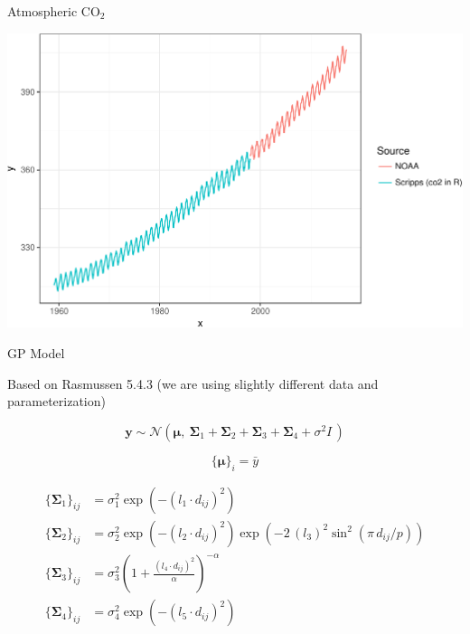 \documentclass[11pt,ignorenonframetext,]{beamer}
\begin{document}
\begin{frame}{%
\protect\hypertarget{atmospheric-co_2}{%
Atmospheric CO\(_2\)}}

\begin{center}\includegraphics[width=\textwidth]{Lec14_files/figure-beamer/unnamed-chunk-14-1} \end{center}

\end{frame}

\begin{frame}[t]{%
\protect\hypertarget{gp-model}{%
GP Model}}

Based on Rasmussen 5.4.3 (we are using slightly different data and
parameterization)

\[ \symbf{y} \sim \mathcal{N}(\symbf{\mu},~ \symbf{\Sigma}_1 + \symbf{\Sigma}_2 + \symbf{\Sigma}_3 + \symbf{\Sigma}_4 + \sigma^2 \mathit{I}\,) \]

\[\{\symbf{\mu}\}_i = \bar{y}\]

\[
\begin{aligned}
\{\symbf{\Sigma}_1\}_{ij} &= \sigma^2_1 \exp\left(-(l_1 \cdot d_{ij})^2\right) \\
\{\symbf{\Sigma}_2\}_{ij} &= \sigma^2_2 \exp\left(-(l_2 \cdot d_{ij})^2\right)\exp\left(-2 \, (l_3)^2  \sin^2(\pi \, d_{ij} / p)\right) \\
\{\symbf{\Sigma}_3\}_{ij} &= \sigma^2_3 \left(1+\frac{(l_4 \cdot d_{ij})^2}{\alpha}\right)^{-\alpha} \\
\{\symbf{\Sigma}_4\}_{ij} &= \sigma^2_4 \exp\left(-(l_5 \cdot d_{ij})^2\right)
\end{aligned}
\]

\end{frame}
\end{document}
